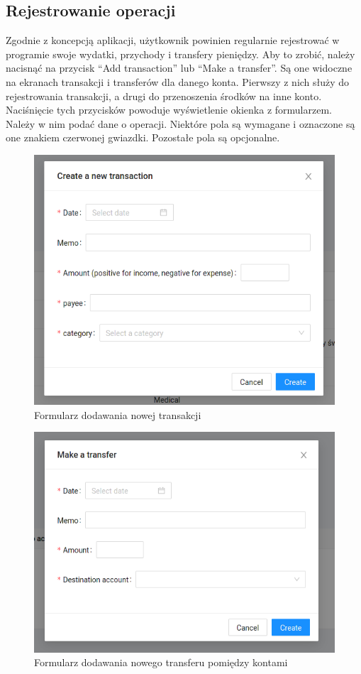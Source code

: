 \documentclass[shortabstract,inz]{iithesis}
\begin{document}
\subsection{Rejestrowanie operacji}
Zgodnie z koncepcją aplikacji, użytkownik powinien regularnie rejestrować w programie swoje wydatki, przychody i transfery pieniędzy. Aby to zrobić, należy nacisnąć na przycisk ``Add transaction'' lub ``Make a transfer''. Są one widoczne na ekranach transakcji i transferów dla danego konta. Pierwszy z nich służy do rejestrowania transakcji, a drugi do przenoszenia środków na inne konto. Naciśnięcie tych przycisków powoduje wyświetlenie okienka z formularzem. Należy w nim podać dane o operacji. Niektóre pola są wymagane i oznaczone są one znakiem czerwonej gwiazdki. Pozostałe pola są opcjonalne.
\begin{figure}
	\centering
	\includegraphics[scale=0.7]{screen-new-transaction-form.png}
	\caption{Formularz dodawania nowej transakcji}
	\label{fig:screen-new-transaction}
\end{figure}
\begin{figure}
	\centering
	\includegraphics[scale=0.7]{screen-make-transfer.png}
	\caption{Formularz dodawania nowego transferu pomiędzy kontami}
	\label{fig:screen-make-transfer}
\end{figure}
\end{document}
